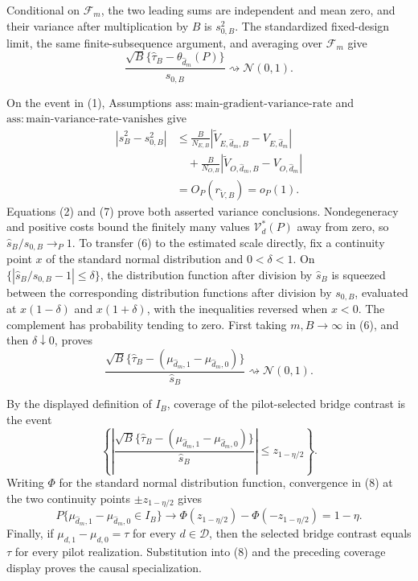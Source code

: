 Conditional on \(\mathcal F_m\), the two leading sums are independent and mean zero, and their variance after multiplication by \(B\) is \(s_{0,B}^2\).  The standardized fixed-design limit, the same finite-subsequence argument, and averaging over \(\mathcal F_m\) give
\[
 \frac{\sqrt B\{\widehat\tau_B-\theta_{\widehat d_m}(P)\}}
 {s_{0,B}}\rightsquigarrow\mathcal N(0,1).                               \tag{6}
\]

On the event in (1), Assumptions \(\mathrm{ass{:}main\text{-}gradient\text{-}variance\text{-}rate}\) and \(\mathrm{ass{:}main\text{-}variance\text{-}rate\text{-}vanishes}\) give
\[
\begin{aligned}
 |\widehat s_B^2-s_{0,B}^2|
 &\le \frac B{N_{E,B}}
 |\widetilde V_{E,\widehat d_m,B}-V_{E,\widehat d_m}|\\
 &\quad+\frac B{N_{O,B}}
 |\widetilde V_{O,\widehat d_m,B}-V_{O,\widehat d_m}|\\
 &=O_P(r_{\widetilde V,B})=o_P(1).
\end{aligned}                                                              \tag{7}
\]
Equations (2) and (7) prove both asserted variance conclusions.  Nondegeneracy and positive costs bound the finitely many values \(\mathcal V_d^*(P)\) away from zero, so \(\widehat s_B/s_{0,B}\to_P1\).  To transfer (6) to the estimated scale directly, fix a continuity point \(x\) of the standard normal distribution and \(0<\delta<1\).  On \(\{|\widehat s_B/s_{0,B}-1|\le\delta\}\), the distribution function after division by \(\widehat s_B\) is squeezed between the corresponding distribution functions after division by \(s_{0,B}\), evaluated at \(x(1-\delta)\) and \(x(1+\delta)\), with the inequalities reversed when \(x<0\).  The complement has probability tending to zero.  First taking \(m,B\to\infty\) in (6), and then \(\delta\downarrow0\), proves
\[
 \frac{\sqrt B\{\widehat\tau_B-(\mu_{\widehat d_m,1}-\mu_{\widehat d_m,0})\}}
 {\widehat s_B}\rightsquigarrow\mathcal N(0,1).                          \tag{8}
\]

By the displayed definition of \(I_B\), coverage of the pilot-selected bridge contrast is the event
\[
 \left\{
 \left|
 \frac{\sqrt B\{\widehat\tau_B-(\mu_{\widehat d_m,1}-\mu_{\widehat d_m,0})\}}
 {\widehat s_B}
 \right|\le z_{1-\eta/2}
 \right\}.
\]
Writing \(\Phi\) for the standard normal distribution function, convergence in (8) at the two continuity points \(\pm z_{1-\eta/2}\) gives
\[
 P\{\mu_{\widehat d_m,1}-\mu_{\widehat d_m,0}\in I_B\}
 \longrightarrow
 \Phi(z_{1-\eta/2})-\Phi(-z_{1-\eta/2})=1-\eta.
\]
Finally, if \(\mu_{d,1}-\mu_{d,0}=\tau\) for every \(d\in\mathcal D\), then the selected bridge contrast equals \(\tau\) for every pilot realization.  Substitution into (8) and the preceding coverage display proves the causal specialization.